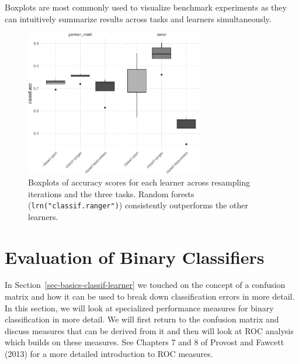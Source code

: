 Boxplots are most commonly used to visualize benchmark experiments as
they can intuitively summarize results across tasks and learners
simultaneously.

\begin{Shaded}
\begin{Highlighting}[]
 \NormalTok{(}\NormalTok{))}
\end{Highlighting}
\end{Shaded}

\begin{figure}

{\centering \includegraphics[width=0.7\textwidth,height=\textheight]{chapters/chapter3/evaluation_and_benchmarking_files/figure-pdf/fig-benchmark-box-1.pdf}

}

\caption{\label{fig-benchmark-box}Boxplots of accuracy scores for each
learner across resampling iterations and the three tasks. Random forests
(\texttt{lrn("classif.ranger")}) consistently outperforms the other
learners.}

\end{figure}

\hypertarget{sec-roc}{%
\section{Evaluation of Binary Classifiers}\label{sec-roc}}

In Section~\ref{sec-basics-classif-learner} we touched on the concept of
a confusion matrix and how it can be used to break down classification
errors in more detail. In this section, we will look at specialized
performance measures for binary
classification in more detail. We will
first return to the confusion matrix and discuss measures that can be
derived from it and then will look at ROC analysis which
builds on these measures. See Chapters 7 and 8 of Provost and Fawcett
(2013) for a more detailed introduction to ROC measures.

